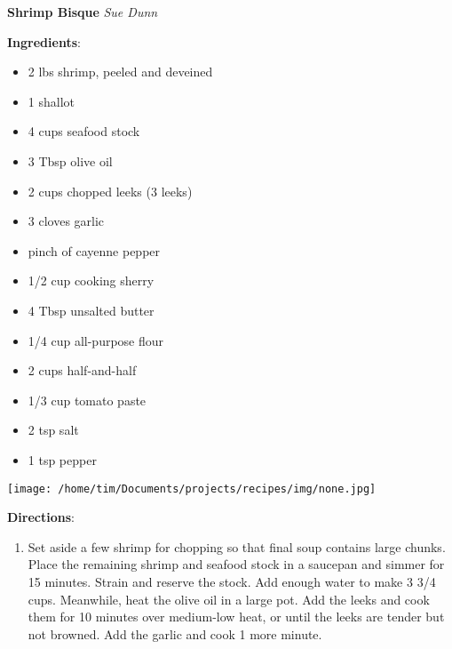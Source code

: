 \documentclass[11pt, twoside, openany]{book}
\begin{document}
\noindent\begin{minipage}[t]{\linewidth}%
{\Large\textbf{Shrimp Bisque}} \label{shrimp-bisque}\hfill\textit{Sue Dunn}\\
\noindent\begin{minipage}[t]{0.78\linewidth}%
\textbf{Ingredients}:\vspace{-3mm}
\begin{multicols}{2}
\begin{itemize}\setlength\itemsep{-1mm}
\item 2 lbs shrimp, peeled and deveined
\item 1 shallot
\item 4 cups seafood stock
\item 3 Tbsp olive oil
\item 2 cups chopped leeks (3 leeks)
\item 3 cloves garlic
\item pinch of cayenne pepper
\item 1/2 cup cooking sherry
\item 4 Tbsp unsalted butter
\item 1/4 cup all-purpose flour
\item 2 cups half-and-half
\item 1/3 cup tomato paste
\item 2 tsp salt
\item 1 tsp pepper
\end{itemize}
\end{multicols}
\end{minipage}
\noindent\begin{minipage}[t]{0.18\linewidth}
\centering \strut\vspace*{-\baselineskip}\newline
\texttt{[image: /home/tim/Documents/projects/recipes/img/none.jpg]}\\
\end{minipage}\vspace{3mm}
\textbf{Directions}:
\vspace{-3mm}\begin{enumerate}\setlength\itemsep{-1mm}
\item Set aside a few shrimp for chopping so that final soup contains large chunks. Place the remaining shrimp and seafood stock in a saucepan and simmer for 15 minutes. Strain and reserve the stock. Add enough water to make 3 3/4 cups. Meanwhile, heat the olive oil in a large pot. Add the leeks and cook them for 10 minutes over medium-low heat, or until the leeks are tender but not browned. Add the garlic and cook 1 more minute.

\end{enumerate}
\end{minipage}
\end{document}
